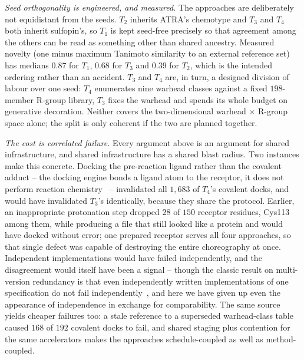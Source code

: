 \emph{Seed orthogonality is engineered, and measured.}
The approaches are deliberately not equidistant from the seeds.
$T_2$ inherits ATRA's chemotype and $T_3$ and $T_4$ both inherit
sulfopin's, so $T_1$ is kept seed-free precisely so that agreement among
the others can be read as something other than shared ancestry.
Measured novelty (one minus maximum Tanimoto similarity to an external
reference set) has medians $0.87$ for $T_1$, $0.68$ for $T_3$ and $0.39$
for $T_2$, which is the intended ordering rather than an accident.
$T_3$ and $T_4$ are, in turn, a designed division of labour over one
seed: $T_4$ enumerates nine warhead classes against a fixed
$198$-member R-group library, $T_3$ fixes the warhead and spends its
whole budget on generative decoration.
Neither covers the two-dimensional warhead $\times$ R-group space alone;
the split is only coherent if the two are planned together.

\emph{The cost is correlated failure.}
Every argument above is an argument for shared infrastructure, and
shared infrastructure has a shared blast radius.
Two instances make this concrete.
Docking the pre-reaction ligand rather than the covalent adduct -- the
docking engine bonds a ligand atom to the receptor, it does not perform
reaction chemistry~\cite{scarpino_comparative_2018,bianco_covalent_2015,london_covalent_2014}
-- invalidated all $1{,}683$ of $T_4$'s covalent docks, and would have
invalidated $T_3$'s identically, because they share the protocol.
Earlier, an inappropriate protonation step dropped $28$ of $150$
receptor residues, Cys113 among them, while producing a file that still
looked like a protein and would have docked without error; one prepared
receptor serves all four approaches, so that single defect was capable
of destroying the entire choreography at once.
Independent implementations would have failed independently, and the
disagreement would itself have been a signal -- though the classic
result on multi-version redundancy is that even independently written
implementations of one specification do not fail
independently~\cite{knight_experimental_1986}, and here we have given up
even the appearance of independence in exchange for comparability.
The same source yields cheaper failures too: a stale reference to a
superseded warhead-class table caused $168$ of $192$ covalent docks to
fail, and shared staging plus contention for the same accelerators makes
the approaches schedule-coupled as well as method-coupled.

